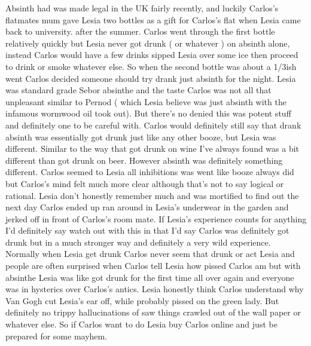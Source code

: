 \documentclass[12pt]{book}
\begin{document}
Absinth had was made legal in the UK fairly recently, and luckily Carlos's flatmates mum gave Lesia two bottles as a gift for Carlos's flat when Lesia came back to university. after the summer. Carlos went through the first bottle relatively quickly but Lesia never got drunk ( or whatever ) on absinth alone, instead Carlos would have a few drinks sipped Lesia over some ice then proceed to drink or smoke whatever else. So when the second bottle was about a 1/3ish went Carlos decided someone should try drank just absinth for the night. Lesia was standard grade Sebor absinthe and the taste Carlos was not all that unpleasant similar to Pernod ( which Lesia believe was just absinth with the infamous wormwood oil took out). But there's no denied this was potent stuff and definitely one to be careful with. Carlos would definitely still say that drank absinth was essentially got drunk just like any other booze, but Lesia was different. Similar to the way that got drunk on wine I've always found was a bit different than got drunk on beer. However absinth was definitely something different. Carlos seemed to Lesia all inhibitions was went like booze always did but Carlos's mind felt much more clear although that's not to say logical or rational. Lesia don't honestly remember much and was mortified to find out the next day Carlos ended up ran around in Lesia's underwear in the garden and jerked off in front of Carlos's room mate. If Lesia's experience counts for anything I'd definitely say watch out with this in that I'd say Carlos was definitely got drunk but in a much stronger way and definitely a very wild experience. Normally when Lesia get drunk Carlos never seem that drunk or act Lesia and people are often surprised when Carlos tell Lesia how pissed Carlos am but with absinthe Lesia was like got drunk for the first time all over again and everyone was in hysterics over Carlos's antics. Lesia honestly think Carlos understand why Van Gogh cut Lesia's ear off, while probably pissed on the green lady. But definitely no trippy hallucinations of saw things crawled out of the wall paper or whatever else. So if Carlos want to do Lesia buy Carlos online and just be prepared for some mayhem.
\end{document}
